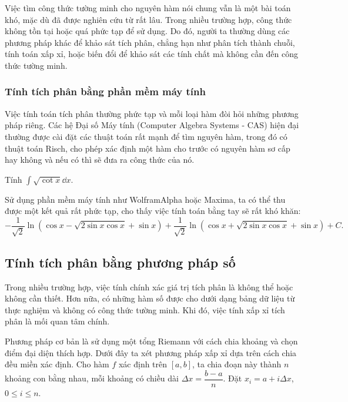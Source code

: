 Việc tìm công thức tường minh cho nguyên hàm nói chung vẫn là một bài toán khó, mặc dù đã được nghiên cứu từ rất lâu. Trong nhiều trường hợp, công thức không tồn tại hoặc quá phức tạp để sử dụng. Do đó, người ta thường dùng các phương pháp khác để khảo sát tích phân, chẳng hạn như phân tích thành chuỗi, tính toán xấp xỉ, hoặc biến đổi để khảo sát các tính chất mà không cần đến công thức tường minh.

\subsubsection{Tính tích phân bằng phần mềm máy tính}

Việc tính toán tích phân thường phức tạp và mỗi loại hàm đòi hỏi những phương pháp riêng. Các hệ Đại số Máy tính (Computer Algebra Systems - CAS) hiện đại thường được cài đặt các thuật toán rất mạnh để tìm nguyên hàm, trong đó có thuật toán Risch, cho phép xác định một hàm cho trước có nguyên hàm sơ cấp hay không và nếu có thì sẽ đưa ra công thức của nó.

\begin{example}
    Tính $\int \sqrt{\cot x} \dd x$.
\end{example}
\begin{solution}
    Sử dụng phần mềm máy tính như WolframAlpha hoặc Maxima, ta có thể thu được một kết quả rất phức tạp, cho thấy việc tính toán bằng tay sẽ rất khó khăn:
    \[
        -\dfrac{1}{\sqrt{2}}\ln(\cos x - \sqrt{2\sin x \cos x} + \sin x) + \dfrac{1}{\sqrt{2}}\ln(\cos x + \sqrt{2\sin x \cos x} + \sin x) + C.
    \]
\end{solution}

\subsection{Tính tích phân bằng phương pháp số}

Trong nhiều trường hợp, việc tính chính xác giá trị tích phân là không thể hoặc không cần thiết. Hơn nữa, có những hàm số được cho dưới dạng bảng dữ liệu từ thực nghiệm và không có công thức tường minh. Khi đó, việc tính xấp xỉ tích phân là mối quan tâm chính.

Phương pháp cơ bản là sử dụng một tổng Riemann với cách chia khoảng và chọn điểm đại diện thích hợp. Dưới đây ta xét phương pháp xấp xỉ dựa trên cách chia đều miền xác định. Cho hàm $f$ xác định trên $[a, b]$, ta chia đoạn này thành $n$ khoảng con bằng nhau, mỗi khoảng có chiều dài $\Delta x = \dfrac{b-a}{n}$. Đặt $x_i = a + i\Delta x$, $0 \le i \le n$.

